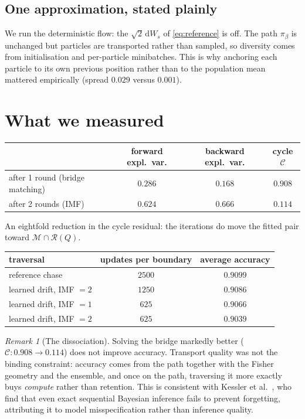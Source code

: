 \documentclass[11pt]{article}
\theoremstyle{definition}
\theoremstyle{plain}
\theoremstyle{remark}
\newtheorem{remark}[definition]{Remark}
\newcommand{\Mcal}{\mathcal{M}}
\newcommand{\Rcal}{\mathcal{R}}
\begin{document}
\subsection{One approximation, stated plainly}

We run the deterministic flow: the $\sqrt2\,\mathrm{d}W_s$ of
\eqref{eq:reference} is off. The path $\pi_\beta$ is unchanged but particles are
transported rather than sampled, so diversity comes from initialisation and
per-particle minibatches. This is why anchoring each particle to its own
previous position rather than to the population mean mattered empirically
(spread $0.029$ versus $0.001$).

\section{What we measured}
\label{sec:numbers}

\begin{center}
\begin{tabular}{lccc}
\toprule
& forward expl.\ var. & backward expl.\ var. & cycle $\mathcal{C}$ \\
\midrule
after 1 round (bridge matching) & $0.286$ & $0.168$ & $0.908$ \\
after 2 rounds (IMF) & $0.624$ & $0.666$ & $\mathbf{0.114}$ \\
\bottomrule
\end{tabular}
\end{center}

An eightfold reduction in the cycle residual: the iterations do move the fitted
pair toward $\Mcal \cap \Rcal(Q)$.

\begin{center}
\begin{tabular}{lcc}
\toprule
traversal & updates per boundary & average accuracy \\
\midrule
reference chase & $2500$ & $0.9099$ \\
learned drift, IMF $=2$ & $1250$ & $0.9086$ \\
learned drift, IMF $=1$ & $625$ & $0.9066$ \\
learned drift, IMF $=2$ & $625$ & $0.9039$ \\
\bottomrule
\end{tabular}
\end{center}

\begin{remark}[The dissociation]
Solving the bridge markedly better ($\mathcal{C}: 0.908 \to 0.114$) does not
improve accuracy. Transport quality was not the binding constraint: accuracy
comes from the path together with the Fisher geometry and the ensemble, and once
on the path, traversing it more exactly buys \emph{compute} rather than
retention. This is consistent with Kessler et al.\ \cite{kessler}, who find that
even exact sequential Bayesian inference fails to prevent forgetting, attributing
it to model misspecification rather than inference quality.
\end{remark}
\end{document}
